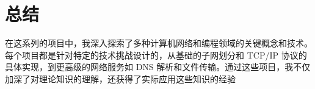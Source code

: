 \documentclass[UTF8,titlepage]{ctexart}
\numberwithin{figure}{section}
\begin{document}
\clearpage

\section{总结}
在这系列的项目中，我深入探索了多种计算机网络和编程领域的关键概念和技术。每个项目都是针对特定的技术挑战设计的，从基础的子网划分和 TCP/IP 协议的具体实现，到更高级的网络服务如 DNS 解析和文件传输。通过这些项目，我不仅加深了对理论知识的理解，还获得了实际应用这些知识的经验
\end{document}
